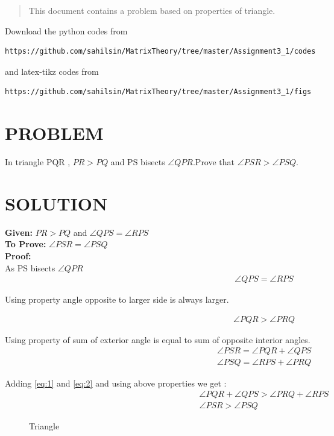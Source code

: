 \begin{abstract}
This document contains a problem based on properties of triangle.
\end{abstract}

Download the python codes from 
%
\begin{lstlisting}
https://github.com/sahilsin/MatrixTheory/tree/master/Assignment3_1/codes
\end{lstlisting}
%
and latex-tikz codes from 
%
\begin{lstlisting}
https://github.com/sahilsin/MatrixTheory/tree/master/Assignment3_1/figs
\end{lstlisting}
%
\section{PROBLEM}
In triangle PQR , $PR>PQ$ and PS bisects $\angle QPR$.Prove that $\angle PSR > \angle PSQ$. 

\section{SOLUTION}

\textbf{Given:} $PR>PQ$ and $\angle QPS = \angle RPS $\\
\textbf{To Prove:} $\angle PSR = \angle PSQ $\\
\textbf{Proof:}\\

As PS bisects $\angle QPR$
\begin{align}
    \angle QPS = \angle RPS \label{eq:1}
\end{align}

Using property angle opposite to larger side is always larger.

\begin{align}
    \angle PQR > \angle PRQ \label{eq:2}
\end{align}

Using property of sum of exterior angle is equal to sum of opposite interior angles.
\begin{align}
    \angle PSR = \angle PQR + \angle QPS
\\
    \angle PSQ = \angle RPS + \angle PRQ
\end{align}
 
 Adding \ref{eq:1} and \ref{eq:2} and using above properties we get :
 \begin{align}
     \angle PQR + \angle QPS > \angle PRQ + \angle RPS
\\
    \angle PSR > \angle PSQ
 \end{align}

\begin{figure}[h!]
\begin{center}
	\resizebox{\columnwidth/1}{!}{}
\end{center}
\caption{Triangle}
\label{fig:Triangle}
\end{figure}

